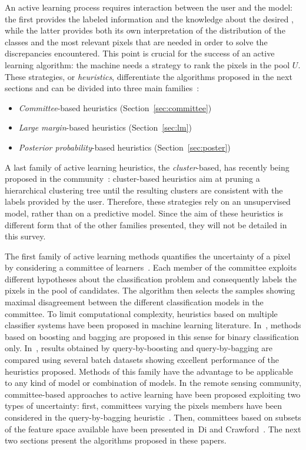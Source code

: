 An active learning process requires interaction between the user and the model: the first provides the labeled information and the knowledge about the desired , while the latter provides both its own interpretation of the distribution of the classes and the most relevant pixels that are needed  in order to solve the discrepancies encountered. This point is crucial for the success of an active learning algorithm: the machine needs a strategy to rank the pixels in the pool $U$. 
These strategies, or \emph{heuristics}, differentiate the algorithms proposed in the next sections and can be divided into three main families~: 
\begin{itemize}
	\item[1 -] \emph{Committee}-based heuristics (Section~\ref{sec:committee})
	\item[2 -] \emph{Large margin}-based heuristics (Section~\ref{sec:lm})
	\item[3 -] \emph{Posterior probability}-based heuristics (Section~\ref{sec:poster})
\end{itemize}
A last family of active learning heuristics, the \emph{cluster}-based, has recently being proposed in the community~: cluster-based heuristics aim at pruning a hierarchical clustering tree until the resulting clusters are consistent with the labels provided by the user. Therefore, these strategies rely on an unsupervised model, rather than on a predictive model. Since the aim of these heuristics is different form that of the other families presented, they will not be detailed in this survey.

\label{sec:committee}
The first family of active learning methods quantifies the uncertainty of a pixel  by considering a committee of learners~. Each member of the committee exploits different hypotheses about the classification problem and consequently labels the pixels in the pool of candidates. The algorithm then selects the samples showing maximal disagreement between the different classification models in the committee.  
To limit computational complexity, heuristics based on multiple classifier systems have been proposed in machine learning literature. In~, methods based on boosting and bagging are proposed in this sense for binary classification only. In~, results obtained by query-by-boosting and query-by-bagging are compared using several batch datasets showing excellent performance of the heuristics proposed. Methods of this family have the advantage to be applicable to any kind of model or combination of  models. 
In the remote sensing community, committee-based approaches to active learning have been proposed exploiting two types of uncertainty: first, committees varying the pixels members have been considered in the query-by-bagging heuristic~. Then, committees based on subsets of the feature space available have been presented in~Di and Crawford~. The next two sections present the algorithms proposed in these papers.

